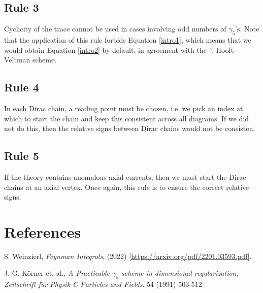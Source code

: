 \documentclass[12pt]{article}
\numberwithin{equation}{section}
\numberwithin{figure}{section}
\numberwithin{table}{section}
\begin{document}
        \subsection{Rule 3}

        Cyclicity of the trace cannot be used in cases involving odd numbers of \(\gamma_5\)'s. Note that the application of this rule forbids Equation \ref{intro1}, which means that we would obtain Equation \ref{intro2} by default, in agreement with the 't Hooft-Veltman scheme. 

        \subsection{Rule 4}

        In each Dirac chain, a reading point must be chosen, i.e. we pick an index at which to start the chain and keep this consistent across all diagrams. If we did not do this, then the relative signs between Dirac chains would not be consisten. 

        \subsection{Rule 5}

        If the theory contains anomalous axial currents, then we must start the Dirac chains at an axial vertex. Once again, this rule is to ensure the correct relative signs. 

        

        \section{References}

        \noindent
        [1] S. Weinzierl, \textit{Feynman Integrals}, (2022) [\hyperlink{}{https://arxiv.org/pdf/2201.03593.pdf}].

        \noindent
        [2] J. G. K\"orner et. al., \textit{A Practicable \(\gamma_5\)-scheme in dimensional regularization}, \textit{Zeitschrift f\"ur Physik C Particles and Fields}. 54 (1991) 503-512. 
\end{document}
